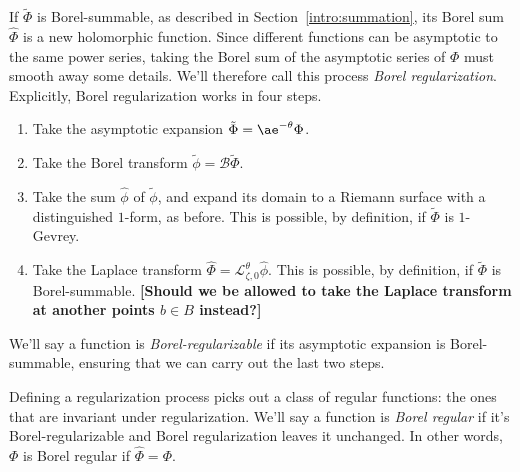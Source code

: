\documentclass{article}
\theoremstyle{definition}
\newcommand{\series}[1]{\tilde{#1}}
\newcommand{\laplace}{\mathcal{L}}
\newcommand{\borel}{\mathcal{B}}
\newcommand{\aexp}{\ae}
\begin{document}
\begin{center}
\end{center}
If $\series{\Phi}$ is Borel-summable, as described in Section~\ref{intro:summation}, its Borel sum $\hat{\Phi}$ is a new holomorphic function.
Since different functions can be asymptotic to the same power series, taking the Borel sum of the asymptotic series of $\Phi$ must smooth away some details. We'll therefore call this process {\em Borel regularization}. Explicitly, Borel regularization works in four steps.
\begin{enumerate}
\item Take the asymptotic expansion $\series{\Phi} = \aexp^{-\theta} \Phi$.
\item Take the Borel transform $\series{\phi} = \borel \series{\Phi}$.
\item Take the sum $\hat{\phi}$ of $\series{\phi}$, and expand its domain to a Riemann surface with a distinguished $1$-form, as before. This is possible, by definition, if $\series{\Phi}$ is $1$-Gevrey.
\item Take the Laplace transform $\hat{\Phi} = \laplace_{\zeta, 0}^\theta \hat{\phi}$. This is possible, by definition, if $\series{\Phi}$ is Borel-summable. \textbf{[Should we be allowed to take the Laplace transform at another points $b \in B$ instead?]}
\end{enumerate}
We'll say a function is {\em Borel-regularizable} if its asymptotic expansion is Borel-summable, ensuring that we can carry out the last two steps.

Defining a regularization process picks out a class of regular functions: the ones that are invariant under regularization. We'll say a function is {\em Borel regular} if it's Borel-regularizable and Borel regularization leaves it unchanged. In other words, $\Phi$ is Borel regular if $\hat{\Phi} = \Phi$.
\end{document}
